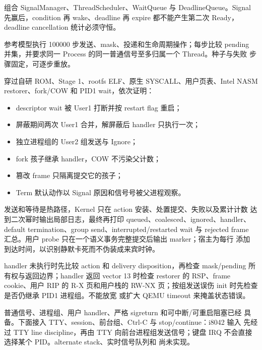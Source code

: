 组合 SignalManager、ThreadScheduler、WaitQueue 与 DeadlineQueue。Signal
先赢后，condition 再 wake、deadline 再 expire 都不能产生第二次 Ready，
deadline cancellation 统计必须守恒。

参考模型执行 100000 步发送、mask、投递和生命周期操作；每步比较 pending
并集，并要求同一 Process 的同一普通信号至多归属一个 Thread。种子与失败
步骤固定，可逐步重放。

 穿过自研 ROM、Stage 1、rootfs ELF、原生
SYSCALL、用户页表、Intel NASM restorer、fork/COW 和 PID1 wait，依次证明：

\begin{itemize}
  \item descriptor wait 被 User1 打断并按 restart flag 重启；
  \item 屏蔽期间两次 User1 合并，解屏蔽后 handler 只执行一次；
  \item 独立进程组的 User2 组发送与 Ignore；
  \item fork 孩子继承 handler，COW 不污染父计数；
  \item 篡改 frame 只隔离提交它的孩子；
  \item Term 默认动作以 Signal 原因和信号号被父进程观察。
\end{itemize}

发送和等待是热路径，Kernel 只在 action 安装、处置提交、失败以及累计计数
达到二次幂时输出局部日志，最终再打印 queued、coalesced、ignored、handler、
default termination、group send、interrupted/restarted wait 与 rejected
frame 汇总。用户 probe 只在一个语义事务完整提交后输出 marker；宿主为每行
添加 \code{[QEMU][T+...ms]} 到达时间，以识别静默卡死而不伪装成来宾时钟。

handler 未执行时先比较 action 和 delivery disposition，再检查 mask/pending
所有权与返回边界；handler 返回 vector 13 时检查 restorer 的 RSP、frame
cookie、用户 RIP 的 R-X 页和用户栈的 RW-NX 页；按组发送误伤 init 时先检查
是否仍继承 PID1 进程组。不能放宽  或扩大 QEMU
timeout 来掩盖状态错误。

普通信号、进程组、用户 handler、严格 sigreturn 和可中断/可重启阻塞已经
具备。下面接入 TTY、session、前台组、Ctrl-C 与 stop/continue：i8042 输入
先经过 TTY line discipline，再由 TTY 向前台进程组发送信号；键盘 IRQ
不会直接选择某个 PID。alternate stack、实时信号队列和
 尚未实现。
